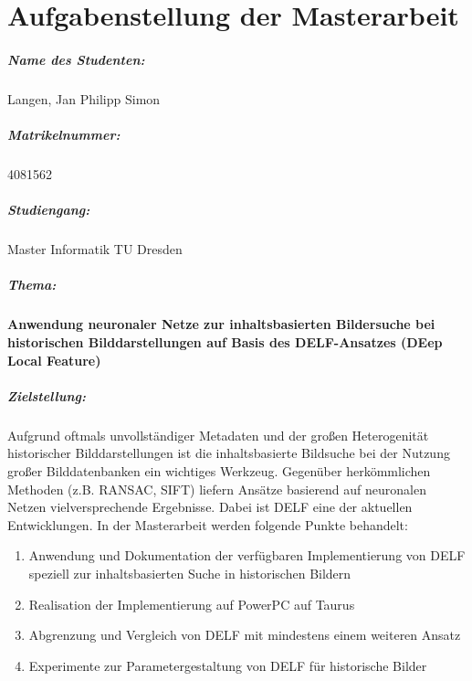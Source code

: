 \chapter*{Aufgabenstellung der Masterarbeit}

\paragraph{Name des Studenten:\qquad} Langen, Jan Philipp Simon
\paragraph{Matrikelnummer:\qquad\qquad\hspace{2pt}} 4081562
\paragraph{Studiengang:\hspace{63pt}} Master Informatik TU Dresden
\paragraph{Thema:\hspace{93.5pt}}
\parbox[t]{310pt}{
\textbf{Anwendung neuronaler Netze zur inhaltsbasierten Bildersuche bei historischen Bilddarstellungen auf Basis des DELF-Ansatzes (DEep Local Feature)}}
\paragraph{Zielstellung:\hspace{67.5pt}}\parbox[t]{310pt}{
Aufgrund oftmals unvollständiger Metadaten und der großen Heterogenität historischer Bilddarstellungen ist die inhaltsbasierte Bildsuche bei der Nutzung großer Bilddatenbanken ein wichtiges Werkzeug. Gegenüber herkömmlichen Methoden (z.B. RANSAC, SIFT) liefern Ansätze basierend auf neuronalen Netzen vielversprechende Ergebnisse. Dabei ist DELF eine der aktuellen Entwicklungen. In der Masterarbeit werden folgende Punkte behandelt:
\begin{enumerate}
\item Anwendung und Dokumentation der verfügbaren Implementierung von DELF speziell zur inhaltsbasierten Suche in historischen Bildern
\item Realisation der Implementierung auf PowerPC auf Taurus
\item Abgrenzung und Vergleich von DELF mit mindestens einem weiteren Ansatz
\item Experimente zur Parametergestaltung von DELF für historische Bilder 
\end{enumerate}
}
